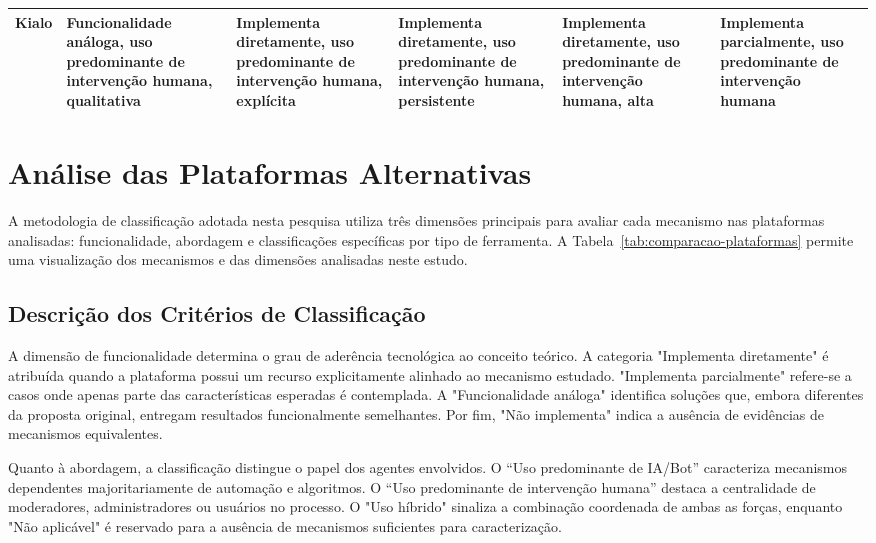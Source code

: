 \documentclass[conference]{IEEEtran} \IEEEoverridecommandlockouts %
\begin{document}
\begin{table}[ht]
\begin{adjustbox}{max width=\textwidth}
\begin{tabularx}{\textwidth}{|
>{\centering\arraybackslash}m{1.8cm}|
Y|Y|Y|Y|Y|
}
\hline

Kialo
&
Funcionalidade análoga, uso predominante de intervenção humana, qualitativa
&
Implementa diretamente, uso predominante de intervenção humana, explícita
&
Implementa diretamente, uso predominante de intervenção humana, persistente
&
Implementa diretamente, uso predominante de intervenção humana, alta
&
Implementa parcialmente, uso predominante de intervenção humana
\\

\hline

\end{tabularx}

\end{adjustbox}

\end{table}

\section{Análise das Plataformas Alternativas}

A metodologia de classificação adotada nesta pesquisa utiliza três dimensões principais para avaliar cada mecanismo nas plataformas analisadas: funcionalidade, abordagem e classificações específicas por tipo de ferramenta. A Tabela~\ref{tab:comparacao-plataformas} permite uma visualização dos mecanismos e das dimensões analisadas neste estudo.

\subsection{Descrição dos Critérios de Classificação}

A dimensão de funcionalidade determina o grau de aderência tecnológica ao conceito teórico. A categoria "Implementa diretamente" é atribuída quando a plataforma possui um recurso explicitamente alinhado ao mecanismo estudado. "Implementa parcialmente" refere-se a casos onde apenas parte das características esperadas é contemplada. A "Funcionalidade análoga" identifica soluções que, embora diferentes da proposta original, entregam resultados funcionalmente semelhantes. Por fim, "Não implementa" indica a ausência de evidências de mecanismos equivalentes.

Quanto à abordagem, a classificação distingue o papel dos agentes envolvidos. O ``Uso predominante de IA/Bot''  caracteriza mecanismos dependentes majoritariamente de automação e algoritmos. O ``Uso predominante de intervenção humana'' destaca a centralidade de moderadores, administradores ou usuários no processo. O "Uso híbrido" sinaliza a combinação coordenada de ambas as forças, enquanto "Não aplicável" é reservado para a ausência de mecanismos suficientes para caracterização.
\end{document}

